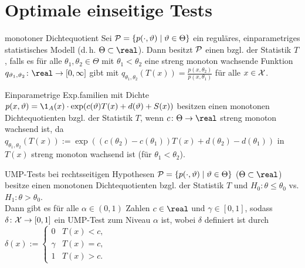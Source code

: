 \section{%
    Optimale einseitige Tests%
}

\begin{Def}{monotoner Dichtequotient}
    Sei $\P = \{p(\cdot, \theta) \;|\; \theta \in \Theta\}$ ein reguläres, einparametriges
    statistisches Modell (d.\,h. $\Theta \subset \real$).
    Dann besitzt $\P$ einen  bzgl. der Statistik $T$,
    falls es für alle $\theta_1, \theta_2 \in \Theta$ mit $\theta_1 < \theta_2$
    eine streng monoton wachsende Funktion
    $q_{\theta_1,\theta_2}\colon \real \rightarrow [0, \infty]$ gibt mit
    $q_{\theta_1,\theta_2}(T(x)) = \frac{p(x, \theta_2)}{p(x, \theta_1)}$ für alle $x \in \X$.
\end{Def}

\begin{Bsp}
    Einparametrige Exp.familien mit Dichte
    $p(x, \theta) = \1_A(x) \cdot \exp(c(\theta)T(x) + d(\theta) + S(x))$
    besitzen einen monotonen Dichtequotienten bzgl. der Statistik $T$,
    wenn $c\colon \Theta \rightarrow \real$ streng monoton wachsend ist,
    da $q_{\theta_1,\theta_2}(T(x)) := \exp((c(\theta_2) - c(\theta_1)) T(x) +
    d(\theta_2) - d(\theta_1))$ in $T(x)$ streng monoton wachsend ist
    (für $\theta_1 < \theta_2$).
\end{Bsp}

\begin{Satz}{UMP-Tests bei rechtsseitigen Hypothesen}
    $\P = \{p(\cdot, \theta) \;|\; \theta \in \Theta\}$ ($\Theta \subset \real$) besitze
    einen monotonen Dichtequotienten bzgl. der Statistik $T$ und
    $H_0\colon \theta \le \theta_0$ vs. $H_1\colon \theta > \theta_0$.\\
    Dann gibt es für alle $\alpha \in (0, 1)$ Zahlen $c \in \real$ und $\gamma \in [0, 1]$,
    sodass $\delta\colon \X \rightarrow [0, 1]$ ein UMP-Test zum Niveau $\alpha$ ist, wobei
    $\delta$ definiert ist durch
    $\delta(x) :=  \begin{cases}0 & T(x) < c,\\
    \gamma & T(x) = c,\\1 & T(x) > c.\end{cases}$
\end{Satz}

